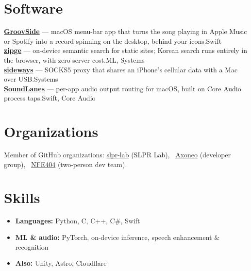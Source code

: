 \documentclass[10pt,a4paper]{article}
\begin{document}
\section{Software}
\textbf{\href{https://zinu.kim/groovside}{GroovSide}} — macOS menu-bar app that turns the song playing in Apple Music or Spotify into a record spinning on the desktop, behind your icons.\hfill{\color{muted}Swift}\\[4pt]
\textbf{\href{https://github.com/soysaucecrab/zipge}{zipge}} — on-device semantic search for static sites; Korean search runs entirely in the browser, with zero server cost.\hfill{\color{muted}ML, Systems}\\[4pt]
\textbf{\href{https://github.com/soysaucecrab/sideways}{sideways}} — SOCKS5 proxy that shares an iPhone's cellular data with a Mac over USB.\hfill{\color{muted}Systems}\\[4pt]
\textbf{\href{https://github.com/soysaucecrab/SoundLanes}{SoundLanes}} — per-app audio output routing for macOS, built on Core Audio process taps.\hfill{\color{muted}Swift, Core Audio}

\section{Organizations}
Member of GitHub organizations:
\href{https://github.com/slpr-lab}{slpr-lab} (SLPR Lab),\ %
\href{https://github.com/Axoneo}{Axoneo} (developer group),\ %
\href{https://github.com/NFE404}{NFE404} (two-person dev team).

\section{Skills}
\begin{itemize}[leftmargin=1.1em,itemsep=2pt,topsep=4pt]
  \item \textbf{Languages:} Python, C, C++, C\#, Swift
  \item \textbf{ML \& audio:} PyTorch, on-device inference, speech enhancement \& recognition
  \item \textbf{Also:} Unity, Astro, Cloudflare
\end{itemize}
\end{document}
